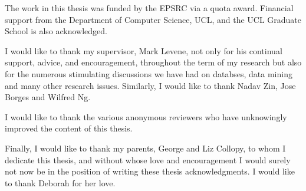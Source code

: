 
\begin{acknowledgements}

The work in this thesis was funded by the EPSRC via a quota award. 
Financial support from the Department of Computer Science, UCL, and
the UCL Graduate School is also acknowledged.

\medskip

I would like to thank my supervisor, Mark Levene, not only for his
continual support, advice, and encouragement, throughout the term of
my research but also for the numerous stimulating discussions we have had
on databses, data mining and many other research issues.  Similarly, I would
like to thank Nadav Zin, Jose Borges and Wilfred Ng.

\medskip

I would like to thank the various anonymous reviewers who have
unknowingly improved the content of this thesis.

\medskip

Finally, I would like to thank my parents,
George and Liz Collopy, to whom I dedicate this thesis, and without
whose love and encouragement I would surely not now be in the position
of writing these thesis acknowledgments. I would like to thank Deborah
for her love.  

\end{acknowledgements}

